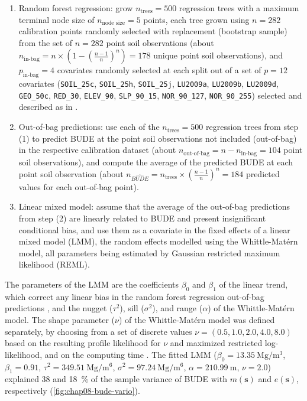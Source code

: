 \begin{enumerate}[label = (\Roman*)]
\item Random forest regression: grow $n_{\text{trees}} = 500$ regression trees with a maximum terminal node 
size of $n_{\text{node size}} = 5$ points, each tree grown using $n = 282$ calibration points randomly selected 
with replacement (bootstrap sample) from the set of $n = 282$ point soil observations (about $n_{\text{in-bag}} 
= n \times \left(1 - \left(\frac{n - 1}{n}\right)^{n}\right) = 178$ unique point soil observations), and 
$p_{\text{in-bag}} = 4$ covariates randomly selected at each split out of a set of $p = 12$ covariates 
(\texttt{SOIL\_25c}, \texttt{SOIL\_25h}, \texttt{SOIL\_25j}, \texttt{LU2009a}, \texttt{LU2009b}, 
\texttt{LU2009d}, \texttt{GEO\_50c}, \texttt{RED\_30}, \texttt{ELEV\_90}, \texttt{SLP\_90\_15}, 
\texttt{NOR\_90\_127}, \texttt{NOR\_90\_255}) selected and described as in \citet{Samuel-RosaEtAl2015}.

\item Out-of-bag predictions: use each of the $n_{\text{trees}} = 500$ regression trees from step (1) to 
predict BUDE at the point soil observations not included (out-of-bag) in the respective calibration dataset 
(about $n_{\text{out-of-bag}} = n - n_{\text{in-bag}} = 104$ point soil observations), and compute the average 
of the predicted BUDE at each point soil observation (about $n_{\widehat{BUDE}} = n_{\text{trees}} \times 
\left(\frac{n - 1}{n}\right)^{n} = 184$ predicted values for each out-of-bag point).

\item Linear mixed model: assume that the average of the out-of-bag predictions from step (2) are linearly 
related to BUDE and present insignificant conditional bias, and use them as a covariate in the fixed effects of 
a linear mixed model (LMM), the random effects modelled using the Whittle-Matérn model, all parameters being 
estimated by Gaussian restricted maximum likelihood (REML).
\end{enumerate}

The parameters of the LMM are the coefficients $\beta_0$ and $\beta_1$ of the linear trend, which correct any 
linear bias in the random forest regression out-of-bag predictions \cite{LiawEtAl2002}, and the nugget 
($\tau^2$), sill ($\sigma^2$), and range ($\alpha$) of the Whittle-Matérn model. The shape parameter ($\nu$) of 
the Whittle-Matérn model was defined separately, by choosing from a set of discrete values $\nu = (0.5, 1.0, 
2.0, 4.0, 8.0)$ based on the resulting profile likelihood for $\nu$ and maximized restricted log-likelihood, 
and on the computing time \cite{Stein1999, DiggleEtAl2007}. The fitted LMM ($\beta_0 = 
\SI{13.35}{\mega\gram\per\cubic\metre}$, $\beta_1 = 0.91$, $\tau^2 = 
\SI{349.51}{\mega\gram\per\metre\tothe{6}}$, $\sigma^2 = \SI{97.24}{\mega\gram\per\metre\tothe{6}}$, $\alpha = 
\SI{210.99}{\metre}$, $\nu = 2.0$) explained \num{38} and \SI{18}{\percent} of the sample variance of BUDE with 
$m(\boldsymbol{s})$ and $e(\boldsymbol{s})$, respectively (\autoref{fig:chap08-bude-vario}).


